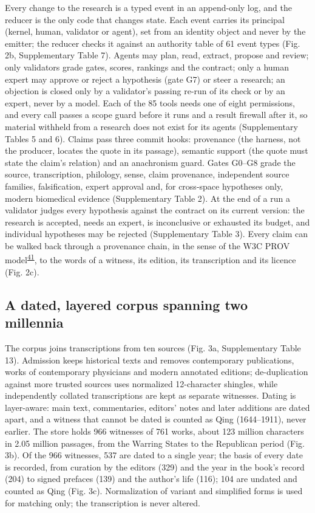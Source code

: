 \documentclass[
]{article}
\begin{document}
Every change to the research is a typed event in an append-only log, and
the reducer is the only code that changes state. Each event carries its
principal (kernel, human, validator or agent), set from an identity
object and never by the emitter; the reducer checks it against an
authority table of 61 event types (Fig. 2b, Supplementary Table 7).
Agents may plan, read, extract, propose and review; only validators
grade gates, scores, rankings and the contract; only a human expert may
approve or reject a hypothesis (gate G7) or steer a research; an
objection is closed only by a validator's passing re-run of its check or
by an expert, never by a model. Each of the 85 tools needs one of eight
permissions, and every call passes a scope guard before it runs and a
result firewall after it, so material withheld from a research does not
exist for its agents (Supplementary Tables 5 and 6). Claims pass three
commit hooks: provenance (the harness, not the producer, locates the
quote in its passage), semantic support (the quote must state the
claim's relation) and an anachronism guard. Gates G0--G8 grade the
source, transcription, philology, sense, claim provenance, independent
source families, falsification, expert approval and, for cross-space
hypotheses only, modern biomedical evidence (Supplementary Table 2). At
the end of a run a validator judges every hypothesis against the
contract on its current version: the research is accepted, needs an
expert, is inconclusive or exhausted its budget, and individual
hypotheses may be rejected (Supplementary Table 3). Every claim can be
walked back through a provenance chain, in the sense of the W3C PROV
model\textsuperscript{\protect\hyperlink{ref-moreau2013provdm}{41}}, to
the words of a witness, its edition, its transcription and its licence
(Fig. 2c).

\hypertarget{a-dated-layered-corpus-spanning-two-millennia}{%
\subsection{A dated, layered corpus spanning two
millennia}\label{a-dated-layered-corpus-spanning-two-millennia}}

The corpus joins transcriptions from ten sources (Fig. 3a, Supplementary
Table 13). Admission keeps historical texts and removes contemporary
publications, works of contemporary physicians and modern annotated
editions; de-duplication against more trusted sources uses normalized
12-character shingles, while independently collated transcriptions are
kept as separate witnesses. Dating is layer-aware: main text,
commentaries, editors' notes and later additions are dated apart, and a
witness that cannot be dated is counted as Qing (1644--1911), never
earlier. The store holds 966 witnesses of 761 works, about 123 million
characters in 2.05 million passages, from the Warring States to the
Republican period (Fig. 3b). Of the 966 witnesses, 537 are dated to a
single year; the basis of every date is recorded, from curation by the
editors (329) and the year in the book's record (204) to signed prefaces
(139) and the author's life (116); 104 are undated and counted as Qing
(Fig. 3c). Normalization of variant and simplified forms is used for
matching only; the transcription is never altered.
\end{document}
